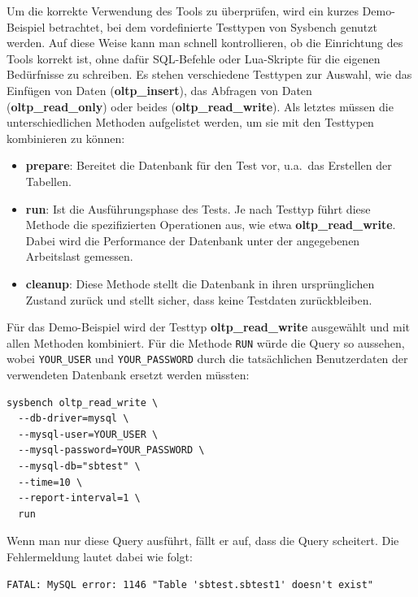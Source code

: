 Um die korrekte Verwendung des Tools zu überprüfen, wird ein kurzes Demo-Beispiel betrachtet, bei dem vordefinierte Testtypen von Sysbench genutzt werden.
Auf diese Weise kann man schnell kontrollieren, ob die Einrichtung des Tools korrekt ist, ohne dafür SQL-Befehle oder Lua-Skripte für die eigenen Bedürfnisse zu schreiben.
Es stehen verschiedene Testtypen zur Auswahl, wie das Einfügen von Daten (\textbf{oltp\_insert}), das Abfragen von Daten (\textbf{oltp\_read\_only}) oder beides (\textbf{oltp\_read\_write}).
Als letztes müssen die unterschiedlichen Methoden aufgelistet werden, um sie mit den Testtypen kombinieren zu können:

\begin{itemize}
    \setlength{\itemsep}{-3pt}
    \item \textbf{prepare}: Bereitet die Datenbank für den Test vor, u.a.\ das Erstellen der Tabellen.
    \item \textbf{run}: Ist die Ausführungsphase des Tests.
    Je nach Testtyp führt diese Methode die spezifizierten Operationen aus, wie etwa \textbf{oltp\_read\_write}.
    Dabei wird die Performance der Datenbank unter der angegebenen Arbeitslast gemessen.
    \item \textbf{cleanup}: Diese Methode stellt die Datenbank in ihren ursprünglichen Zustand zurück und stellt sicher, dass keine Testdaten zurückbleiben.
\end{itemize}

Für das Demo-Beispiel wird der Testtyp \textbf{oltp\_read\_write} ausgewählt und mit allen Methoden kombiniert.
Für die Methode \texttt{RUN} würde die Query so aussehen, wobei \texttt{YOUR\_USER} und \texttt{YOUR\_PASSWORD} durch die tatsächlichen Benutzerdaten der verwendeten Datenbank ersetzt werden müssten:

\vspace{-5pt}
\begin{lstlisting}[style=custom_daniel,label={lst:tools-sysbench-run}]
sysbench oltp_read_write \
  --db-driver=mysql \
  --mysql-user=YOUR_USER \
  --mysql-password=YOUR_PASSWORD \
  --mysql-db="sbtest" \
  --time=10 \
  --report-interval=1 \
  run
\end{lstlisting}
\vspace{-5pt}

Wenn man nur diese Query ausführt, fällt er auf, dass die Query scheitert.
Die Fehlermeldung lautet dabei wie folgt:

\begin{lstlisting}[style=custom_daniel,label={lst:tools-error-without-prepare}]
FATAL: MySQL error: 1146 "Table 'sbtest.sbtest1' doesn't exist"
\end{lstlisting}

